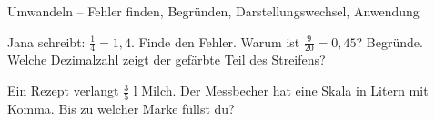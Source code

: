 \begin{aufgabe}{Umwandeln – Fehler finden, Begründen, Darstellungswechsel, Anwendung}
\begin{teile}
\teil Jana schreibt: $\frac{1}{4} = 1{,}4$. Finde den Fehler.
\teil Warum ist $\frac{9}{20} = 0{,}45$? Begründe.
\teil Welche Dezimalzahl zeigt der gefärbte Teil des Streifens?

\leerfeld
\teil Ein Rezept verlangt $\frac{3}{5}$ l Milch. Der Messbecher hat eine Skala in Litern mit Komma. Bis zu welcher Marke füllst du? \leerfeld[l]
\end{teile}
\end{aufgabe}
